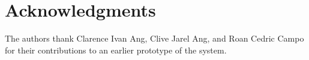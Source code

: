 \section*{Acknowledgments}

The authors thank Clarence Ivan Ang, Clive Jarel Ang, and Roan Cedric Campo for
their contributions to an earlier prototype of the system.